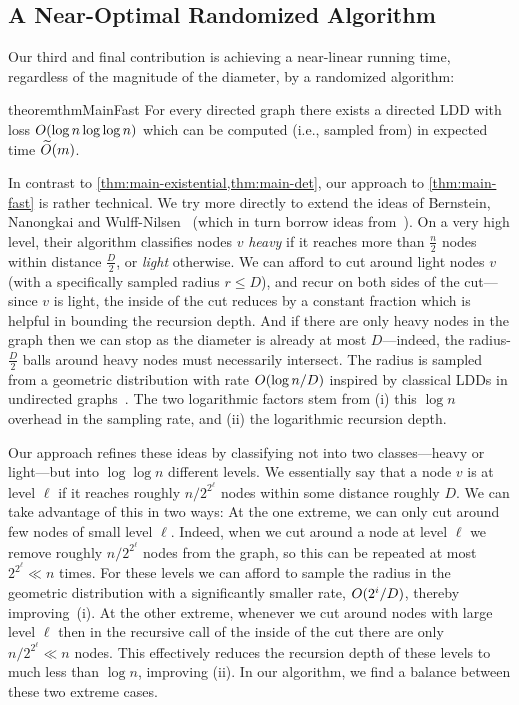 \documentclass[letterpaper,11pt]{article}
\begin{document}
\subsection{A Near-Optimal Randomized Algorithm} \label{sec:overviewFast}

Our third and final contribution is achieving a near-linear running time, regardless of the magnitude of the diameter, by a randomized algorithm:

\begin{restatable}{theorem}{thmMainFast} \label{thm:main-fast}
	For every directed graph there exists a directed LDD with loss $O(\log n \log\log n)$ which can be computed (i.e., sampled from) in expected time $\widetilde{O}(m)$.
\end{restatable}

In contrast to \cref{thm:main-existential,thm:main-det}, our approach to \cref{thm:main-fast} is rather technical. We try more directly to extend the ideas of Bernstein, Nanongkai and Wulff-Nilsen~\cite{BernsteinNW22} (which in turn borrow ideas from~\cite{BernsteinGW20}). On a very high level, their algorithm classifies nodes $v$ \emph{heavy} if it reaches more than $\frac{n}{2}$ nodes within distance $\frac{D}{2}$, or \emph{light} otherwise. We can afford to cut around light nodes $v$ (with a specifically sampled radius $r \leq D$), and recur on both sides of the cut---since $v$ is light, the inside of the cut reduces by a constant fraction which is helpful in bounding the recursion depth. And if there are only heavy nodes in the graph then we can stop as the diameter is already at most $D$---indeed, the radius-$\frac{D}{2}$ balls around heavy nodes must necessarily intersect. The radius is sampled from a geometric distribution with rate $O(\log n / D)$ inspired by classical LDDs in undirected graphs~\cite{Bartal96}. The two logarithmic factors stem from (i) this $\log n$ overhead in the sampling rate, and (ii) the logarithmic recursion depth.

Our approach refines these ideas by classifying not into two classes---heavy or light---but into $\log\log n$ different levels. We essentially say that a node $v$ is at level $\ell$ if it reaches roughly $n / 2^{2^\ell}$ nodes within some distance roughly $D$. We can take advantage of this in two ways: At the one extreme, we can only cut around few nodes of small level $\ell$. Indeed, when we cut around a node at level $\ell$ we remove roughly $n / 2^{2^\ell}$ nodes from the graph, so this can be repeated at most $2^{2^{\ell}} \ll n$ times. For these levels we can afford to sample the radius in the geometric distribution with a significantly smaller rate, $O(2^i / D)$, thereby improving~(i). At the other extreme, whenever we cut around nodes with large level $\ell$ then in the recursive call of the inside of the cut there are only~$n / 2^{2^\ell} \ll n$ nodes. This effectively reduces the recursion depth of these levels to much less than $\log n$, improving (ii). In our algorithm, we find a balance between these two extreme cases. 
\end{document}
